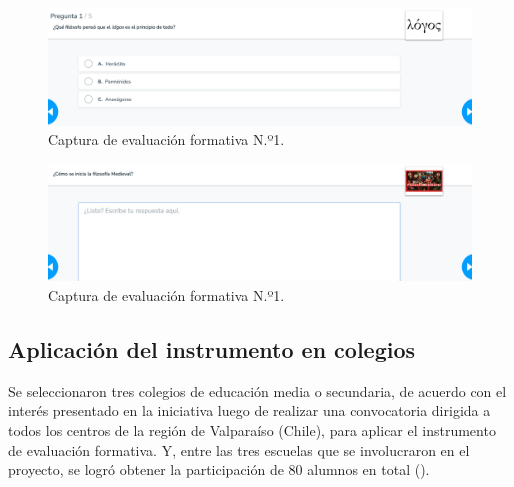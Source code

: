\documentclass[spanish]{textolivre}
\begin{document}
\begin{figure}[h!]
    \centering
    \begin{minipage}{0.77\linewidth}
    \includegraphics[width=\linewidth]{imagens/image3.png}
    \caption{Captura de evaluación formativa N.º1.}
    \label{fig-2}
    \end{minipage}
\end{figure}

\begin{figure}[h!]
    \centering
    \begin{minipage}{0.77\linewidth}
    \includegraphics[width=\linewidth]{imagens/image2.png}
    \caption{Captura de evaluación formativa N.º1.}
    \label{fig-3}
    \end{minipage}
\end{figure}

\subsection{Aplicación del instrumento en colegios}
Se seleccionaron tres colegios de educación media o secundaria, de acuerdo con el interés presentado en la iniciativa luego de realizar una convocatoria dirigida a todos los centros de la región de Valparaíso (Chile), para aplicar el instrumento de evaluación formativa. Y, entre las tres escuelas que se involucraron en el proyecto, se logró obtener la participación de 80 alumnos en total ().
\end{document}
